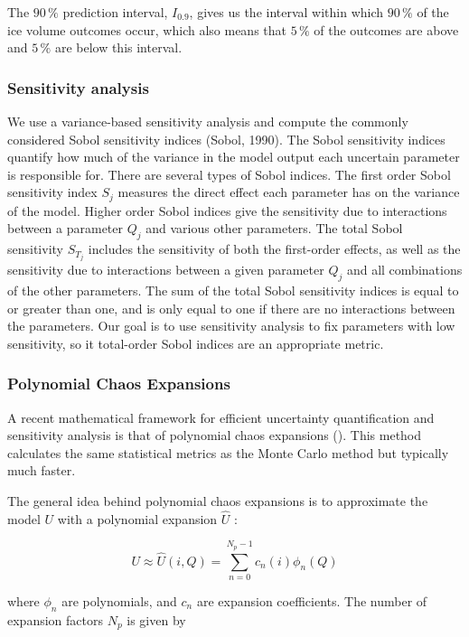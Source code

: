 \documentclass[utf8]{frontiersSCNS}
\begin{document}
The $90\,\%$ prediction interval, $I_{0.9}$, gives us the interval within which $90\,\%$ of the ice volume
outcomes occur, which also means that $5\,\%$ of the outcomes are above and $5\,\%$ are below this interval.

\subsubsection{Sensitivity analysis}

We use a variance-based sensitivity analysis and compute the commonly considered Sobol sensitivity indices
(Sobol, 1990). The Sobol sensitivity indices quantify how much of the variance in the model output each
uncertain parameter is responsible for. There are several types of Sobol indices. The first order Sobol
sensitivity index $S_j$ measures the direct effect each parameter has on the variance of the model. Higher order
Sobol indices give the sensitivity due to interactions between a parameter $Q_j$ and various other parameters.
The total Sobol sensitivity $S_{T_{j}}$ includes the sensitivity of both the first-order effects, as well as the
sensitivity due to interactions between a given parameter $Q_j$ and all combinations of the other
parameters. The sum of the total Sobol sensitivity indices is equal to or greater than one,
and is only equal to one if there are no interactions between the parameters. Our goal is to use sensitivity
analysis to fix parameters with low sensitivity, so it total-order Sobol indices are an appropriate metric.

\subsubsection{Polynomial Chaos Expansions}

A recent mathematical framework for efficient uncertainty quantification and sensitivity analysis is that of
polynomial chaos expansions (\cite{Xiu_2005}). This method calculates the same statistical metrics as the Monte
Carlo method but typically much faster.

The general idea behind polynomial chaos expansions is to approximate the model $U$ with a polynomial expansion
$\hat{U}$ : 

\begin{equation} U \approx \hat{U}(i, Q) = \sum_{n=0}^{N_p-1} c_n(i) \phi_n(Q) \end{equation}

where $\phi_n$ are polynomials, and $c_n$ are expansion coefficients. The number of expansion factors $N_p$ is
given by
\end{document}

